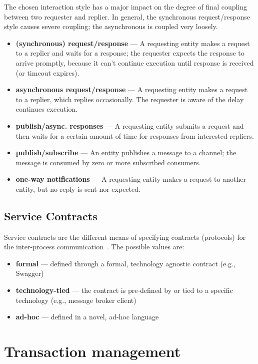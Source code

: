 \documentclass[thesis=M,english,hidelinks]{FITthesis}[2012/10/20]
\begin{document}
The chosen interaction style has a major impact on the degree of final coupling between two requester and replier. In general, the synchronous request/response style causes severe coupling; the asynchronous is coupled very loosely.
\begin{itemize}
    \item \textbf{(synchronous) request/response} --- A requesting entity makes a request to a replier and waits for a response; the requester expects the response to arrive promptly, because it can't continue execution until response is received (or timeout expires).
    \item \textbf{asynchronous request/response} --- A requesting entity makes a request to a replier, which replies occasionally. The requester is aware of the delay continues execution.
    \item \textbf{publish/async. responses} --- A requesting entity submits a request and then waits for a certain amount of time for responses from interested repliers.
    \item \textbf{publish/subscribe} --- An entity publishes a message to a channel; the message is consumed by zero or more subscribed consumers.
    \item \textbf{one-way notifications} --- A requesting entity makes a request to another entity, but no reply is sent nor expected.
\end{itemize}


\subsection{Service Contracts}
Service contracts are the different means of specifying contracts (protocols) for the inter-process communication~\cite{ms-today-tomorrow}. The possible values are:

\begin{itemize}
    \item \textbf{formal} --- defined through a formal, technology agnostic contract (e.g., Swagger)
    \item \textbf{technology-tied} --- the contract is pre-defined by or tied to a specific technology (e.g., message broker client)
    \item \textbf{ad-hoc} --- defined in a novel, ad-hoc language
\end{itemize}

% 
% 
\section{Transaction management}
\label{sec:transaction_management}
\end{document}
